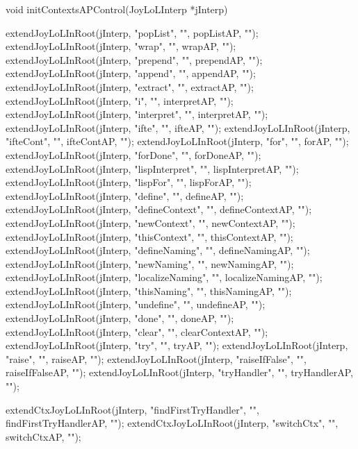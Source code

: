\startCCode
void initContextsAPControl(JoyLoLInterp *jInterp) {
  extendJoyLoLInRoot(jInterp, "popList",        "", popListAP,        "");
  extendJoyLoLInRoot(jInterp, "wrap",           "", wrapAP,           "");
  extendJoyLoLInRoot(jInterp, "prepend",        "", prependAP,        "");
  extendJoyLoLInRoot(jInterp, "append",         "", appendAP,         "");
  extendJoyLoLInRoot(jInterp, "extract",        "", extractAP,        "");
  extendJoyLoLInRoot(jInterp, "i",              "", interpretAP,      "");
  extendJoyLoLInRoot(jInterp, "interpret",      "", interpretAP,      "");
  extendJoyLoLInRoot(jInterp, "ifte",           "", ifteAP,           "");
  extendJoyLoLInRoot(jInterp, "ifteCont",       "", ifteContAP,       "");
  extendJoyLoLInRoot(jInterp, "for",            "", forAP,            "");
  extendJoyLoLInRoot(jInterp, "forDone",        "", forDoneAP,        "");
  extendJoyLoLInRoot(jInterp, "lispInterpret",  "", lispInterpretAP,  "");
  extendJoyLoLInRoot(jInterp, "lispFor",        "", lispForAP,        "");
  extendJoyLoLInRoot(jInterp, "define",         "", defineAP,         "");
  extendJoyLoLInRoot(jInterp, "defineContext",  "", defineContextAP,  "");
  extendJoyLoLInRoot(jInterp, "newContext",     "", newContextAP,     "");
  extendJoyLoLInRoot(jInterp, "thisContext",    "", thisContextAP,    "");
  extendJoyLoLInRoot(jInterp, "defineNaming",   "", defineNamingAP,   "");
  extendJoyLoLInRoot(jInterp, "newNaming",      "", newNamingAP,      "");
  extendJoyLoLInRoot(jInterp, "localizeNaming", "", localizeNamingAP, "");
  extendJoyLoLInRoot(jInterp, "thisNaming",     "", thisNamingAP,     "");
  extendJoyLoLInRoot(jInterp, "undefine",       "", undefineAP,       "");
  extendJoyLoLInRoot(jInterp, "done",           "", doneAP,           "");
  extendJoyLoLInRoot(jInterp, "clear",          "", clearContextAP,   "");
  extendJoyLoLInRoot(jInterp, "try",            "", tryAP,            "");
  extendJoyLoLInRoot(jInterp, "raise",          "", raiseAP,          "");
  extendJoyLoLInRoot(jInterp, "raiseIfFalse",   "", raiseIfFalseAP,   "");
  extendJoyLoLInRoot(jInterp, "tryHandler",     "", tryHandlerAP,     "");
  
  extendCtxJoyLoLInRoot(jInterp, "findFirstTryHandler", "", findFirstTryHandlerAP, "");
  extendCtxJoyLoLInRoot(jInterp, "switchCtx",           "", switchCtxAP,           "");
}
\stopCCode
